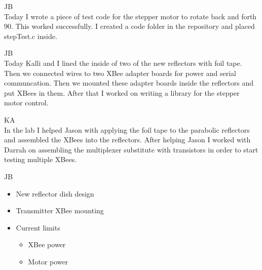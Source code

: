 \documentclass[fontsize=11pt, %
                             paper=letter, %
                             openany, %
                             captions=tableheading,
                             index=totoc,
                             hyperref]{labbook}
\begin{document}
\begin{addmargin}[0cm]{0cm}

JB\\
Today I wrote a piece of test code for the stepper motor to rotate back and forth 90\textdegree. This worked successfully. I created a code folder in the repository and placed stepTest.c inside.

JB\\
Today Kalli and I lined the inside of two of the new reflectors with foil tape. Then we connected wires to two XBee adapter boards for power and serial communcation. Then we mounted these adapter boards inside the reflectors and put XBees in them. After that I worked on writing a library for the stepper motor control.

\vspace*{12pt}
KA\\
In the lab I helped Jason with applying the foil tape to the parabolic reflectors and assembled the XBees into the reflectors. After helping Jason I worked with Darrah on assembling the multiplexer substitute with transistors in order to start testing multiple XBees.

JB\\
\begin{itemize}
    \item New reflector dish design
    \item Transmitter XBee mounting
    \item Current limits
    \begin{itemize}
        \item XBee power
        \item Motor power
    \end{itemize}
\end{itemize}


\end{addmargin}
\end{document}
